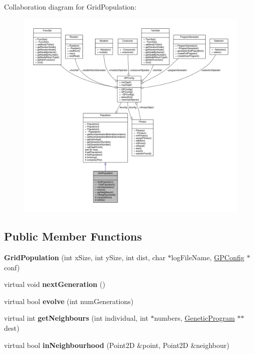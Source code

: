 Collaboration diagram for Grid\+Population\+:
\nopagebreak
\begin{figure}[H]
\begin{center}
\leavevmode
\includegraphics[width=350pt]{classGridPopulation__coll__graph}
\end{center}
\end{figure}
\subsection*{Public Member Functions}
\begin{DoxyCompactItemize}
\item 
\hypertarget{classGridPopulation_ad3529857b166c6e83969671d7dd1d1c9}{}\label{classGridPopulation_ad3529857b166c6e83969671d7dd1d1c9} 
{\bfseries Grid\+Population} (int x\+Size, int y\+Size, int dist, char $\ast$log\+File\+Name, \hyperlink{classGPConfig}{G\+P\+Config} $\ast$conf)
\item 
\hypertarget{classGridPopulation_a6e70ac22deef76063607ed924606b4be}{}\label{classGridPopulation_a6e70ac22deef76063607ed924606b4be} 
virtual void {\bfseries next\+Generation} ()
\item 
\hypertarget{classGridPopulation_a7d8b0eb0e9a22461322408032fef942f}{}\label{classGridPopulation_a7d8b0eb0e9a22461322408032fef942f} 
virtual bool {\bfseries evolve} (int num\+Generations)
\item 
\hypertarget{classGridPopulation_a5c6dc71b10a17a5f9bb574e86a21b6e5}{}\label{classGridPopulation_a5c6dc71b10a17a5f9bb574e86a21b6e5} 
virtual int {\bfseries get\+Neighbours} (int individual, int $\ast$numbers, \hyperlink{classGeneticProgram}{Genetic\+Program} $\ast$$\ast$dest)
\item 
\hypertarget{classGridPopulation_a3d6361d1c013d88f5e78186c017f8f20}{}\label{classGridPopulation_a3d6361d1c013d88f5e78186c017f8f20} 
virtual bool {\bfseries in\+Neighbourhood} (Point2D \&point, Point2D \&neighbour)
\end{DoxyCompactItemize}
